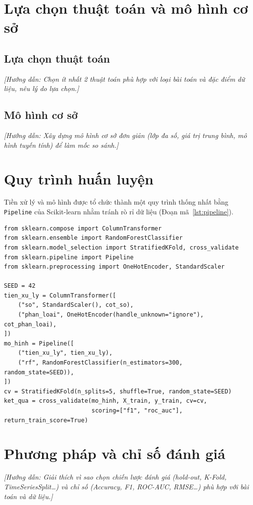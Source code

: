 \documentclass[12pt,a4paper,oneside]{report}
\newcommand{\huongdan}[1]{{\color{guide}\itshape [Hướng dẫn: #1]}}
\begin{document}
\section{Lựa chọn thuật toán và mô hình cơ sở}

\subsection{Lựa chọn thuật toán}
\huongdan{Chọn ít nhất 2 thuật toán phù hợp với loại bài toán và đặc điểm
dữ liệu, nêu lý do lựa chọn.}

\subsection{Mô hình cơ sở}
\huongdan{Xây dựng mô hình cơ sở đơn giản (lớp đa số, giá trị trung bình,
mô hình tuyến tính) để làm mốc so sánh.}

\section{Quy trình huấn luyện}
Tiền xử lý và mô hình được tổ chức thành một quy trình thống nhất bằng
\texttt{Pipeline} của Scikit-learn \cite{pedregosa2011} nhằm tránh rò rỉ dữ
liệu (Đoạn mã~\ref{lst:pipeline}).

\begin{lstlisting}[caption={Xây dựng Pipeline và kiểm định chéo},label={lst:pipeline}]
from sklearn.compose import ColumnTransformer
from sklearn.ensemble import RandomForestClassifier
from sklearn.model_selection import StratifiedKFold, cross_validate
from sklearn.pipeline import Pipeline
from sklearn.preprocessing import OneHotEncoder, StandardScaler

SEED = 42
tien_xu_ly = ColumnTransformer([
    ("so", StandardScaler(), cot_so),
    ("phan_loai", OneHotEncoder(handle_unknown="ignore"), cot_phan_loai),
])
mo_hinh = Pipeline([
    ("tien_xu_ly", tien_xu_ly),
    ("rf", RandomForestClassifier(n_estimators=300, random_state=SEED)),
])
cv = StratifiedKFold(n_splits=5, shuffle=True, random_state=SEED)
ket_qua = cross_validate(mo_hinh, X_train, y_train, cv=cv,
                         scoring=["f1", "roc_auc"], return_train_score=True)
\end{lstlisting}

\section{Phương pháp và chỉ số đánh giá}
\huongdan{Giải thích vì sao chọn chiến lược đánh giá (hold-out, K-Fold,
TimeSeriesSplit\dots) và chỉ số (Accuracy, F1, ROC-AUC, RMSE\dots) phù hợp
với bài toán và dữ liệu.}
\end{document}

